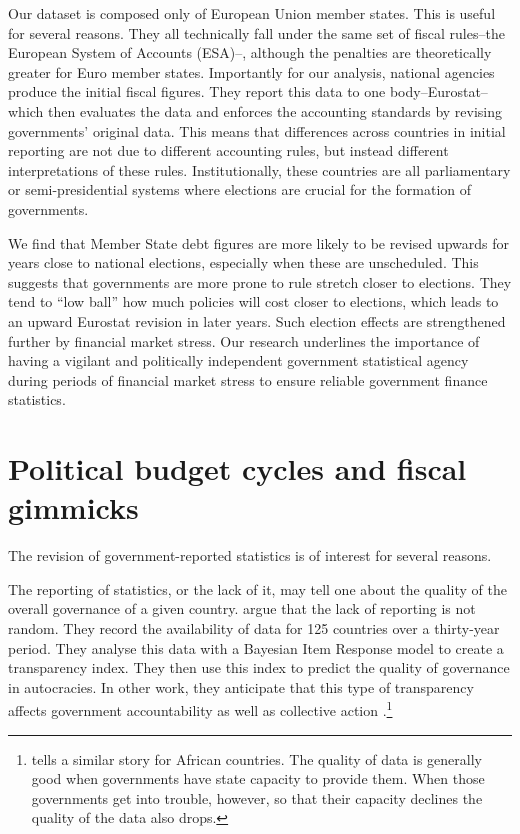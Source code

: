 \documentclass[]{article}
\begin{document}
Our dataset is composed only of European Union member states. This is useful for several reasons. They all technically fall under the same set of fiscal rules--the European System of Accounts (ESA)--, although the penalties are theoretically greater for Euro member states.  Importantly for our analysis, national agencies produce the initial fiscal figures. They report this data to  one body--Eurostat--which then evaluates the data and enforces the accounting standards by revising governments' original data. This means that differences across countries in initial reporting are not due to different accounting rules, but instead  different interpretations of these rules. Institutionally, these countries are all parliamentary or semi-presidential systems where elections are crucial for the formation of governments.

We find that Member State debt figures are more likely to be revised upwards for years close to national elections, especially when these are unscheduled. This suggests that governments are more prone to rule stretch closer to elections. They tend to ``low ball'' how much policies will cost closer to elections, which leads to an upward Eurostat revision in later years. Such election effects are strengthened further by financial market stress. Our research underlines the importance of having a vigilant and politically independent government statistical agency during periods of financial market stress to ensure reliable government finance statistics.

\section{Political budget cycles and fiscal gimmicks}

The revision of government-reported statistics is of interest for several reasons.

The reporting of statistics, or the lack of it, may tell one about the quality of the overall governance of a given country. \cite{Hollyer2014} argue that the lack of reporting is not random. They record the availability of data for 125 countries over a thirty-year period. They analyse this data with a Bayesian Item Response model to create a transparency index. They then use this index to predict the quality of governance in autocracies. In other work, they anticipate that this type of transparency affects government accountability as well as collective action \citep{hollyerforthcoming}.\footnote{\cite{jervin2013} tells a similar story for African countries. The quality of data is generally good when governments have state capacity to provide them. When those governments get into trouble, however, so that their capacity declines the quality of the data also drops.}
\end{document}
